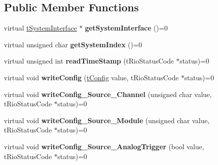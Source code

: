 \subsection*{Public Member Functions}
\begin{DoxyCompactItemize}
\item 
\hypertarget{classnFPGA_1_1nFRC__2012__1__6__4_1_1tInterrupt_ab0677b164021bd1b7e6ce4b491f88a0c}{
virtual \hyperlink{classnFPGA_1_1tSystemInterface}{tSystemInterface} $\ast$ {\bfseries getSystemInterface} ()=0}
\label{classnFPGA_1_1nFRC__2012__1__6__4_1_1tInterrupt_ab0677b164021bd1b7e6ce4b491f88a0c}

\item 
\hypertarget{classnFPGA_1_1nFRC__2012__1__6__4_1_1tInterrupt_ae74969da09f72f2d4c30b662534596c0}{
virtual unsigned char {\bfseries getSystemIndex} ()=0}
\label{classnFPGA_1_1nFRC__2012__1__6__4_1_1tInterrupt_ae74969da09f72f2d4c30b662534596c0}

\item 
\hypertarget{classnFPGA_1_1nFRC__2012__1__6__4_1_1tInterrupt_a92919c9ff488aa681a5ccea284222b05}{
virtual unsigned int {\bfseries readTimeStamp} (tRioStatusCode $\ast$status)=0}
\label{classnFPGA_1_1nFRC__2012__1__6__4_1_1tInterrupt_a92919c9ff488aa681a5ccea284222b05}

\item 
\hypertarget{classnFPGA_1_1nFRC__2012__1__6__4_1_1tInterrupt_aac3e23a2b12736aa66208fcc709287d8}{
virtual void {\bfseries writeConfig} (\hyperlink{unionnFPGA_1_1nFRC__2012__1__6__4_1_1tInterrupt_1_1tConfig}{tConfig} value, tRioStatusCode $\ast$status)=0}
\label{classnFPGA_1_1nFRC__2012__1__6__4_1_1tInterrupt_aac3e23a2b12736aa66208fcc709287d8}

\item 
\hypertarget{classnFPGA_1_1nFRC__2012__1__6__4_1_1tInterrupt_ac5c44eabac08cd6f5c2c16ffd8ffee2f}{
virtual void {\bfseries writeConfig\_\-Source\_\-Channel} (unsigned char value, tRioStatusCode $\ast$status)=0}
\label{classnFPGA_1_1nFRC__2012__1__6__4_1_1tInterrupt_ac5c44eabac08cd6f5c2c16ffd8ffee2f}

\item 
\hypertarget{classnFPGA_1_1nFRC__2012__1__6__4_1_1tInterrupt_a375ac198acf274e223a221a008aa67b8}{
virtual void {\bfseries writeConfig\_\-Source\_\-Module} (unsigned char value, tRioStatusCode $\ast$status)=0}
\label{classnFPGA_1_1nFRC__2012__1__6__4_1_1tInterrupt_a375ac198acf274e223a221a008aa67b8}

\item 
\hypertarget{classnFPGA_1_1nFRC__2012__1__6__4_1_1tInterrupt_a9501ff0733815e075fbc03a2807a1cbe}{
virtual void {\bfseries writeConfig\_\-Source\_\-AnalogTrigger} (bool value, tRioStatusCode $\ast$status)=0}
\label{classnFPGA_1_1nFRC__2012__1__6__4_1_1tInterrupt_a9501ff0733815e075fbc03a2807a1cbe}


\end{DoxyCompactItemize}
